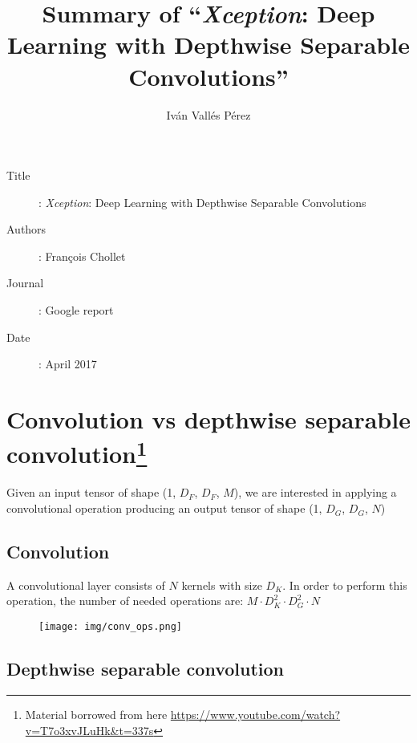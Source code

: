 \documentclass[10pt,a4paper]{article}
\title{Summary of ``\textit{Xception}: Deep Learning with Depthwise Separable Convolutions''}
\date{\vspace{-5ex}}
\author{Iván Vallés Pérez}
\begin{document}
\maketitle

\begin{description}
	\item[Title]: \textit{Xception}: Deep Learning with Depthwise Separable Convolutions
	\item[Authors]: François Chollet
	\item[Journal]: Google report
	\item[Date]: April 2017
\end{description}

\section*{Convolution vs depthwise separable convolution\footnote{Material borrowed from here \url{https://www.youtube.com/watch?v=T7o3xvJLuHk&t=337s}}}
Given an input tensor of shape (1, $D_F$, $D_F$, $M$), we are interested in applying a convolutional operation producing an output tensor of shape (1, $D_G$, $D_G$, $N$)

\subsection*{Convolution}
A convolutional layer consists of $N$ kernels with size $D_K$. In order to perform this operation, the number of needed operations are: $M \cdot D_K^2 \cdot D_G^2 \cdot N$

\begin{figure}[h!]
	\centering
	\texttt{[image: img/conv\_ops.png]}
\end{figure}

\subsection*{Depthwise separable convolution}
\end{document}
